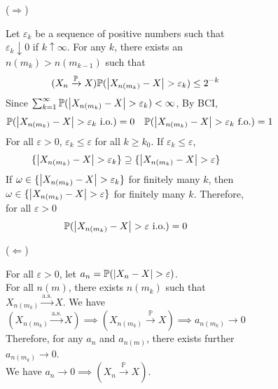 \documentclass{huhtakm-template-book}
\newcommand{\prob}{\mathbb{P}}
\begin{document}
\begin{proofing}
	\begin{figure}[h!]
		\begin{subfigure}[b]{0.05\textwidth}
			($\Longrightarrow$)
		\end{subfigure}
		\begin{subfigure}[t]{0.9\textwidth}
			Let $\varepsilon_{k}$ be a sequence of positive numbers such that $\varepsilon_{k}\downarrow 0$ if $k\uparrow\infty$. For any $k$, there exists an $n(m_{k})>n(m_{k-1})$ such that
			\begin{equation*}
				\tag{$X_{n}\xrightarrow{\prob}X$}
				\prob(\abs{X_{n(m_{k})}-X}>\varepsilon_{k})\leq 2^{-k}
			\end{equation*}
			Since $\sum_{k=1}^{\infty}\prob(\abs{X_{n(m_{k})}-X}>\varepsilon_{k})<\infty$, By BCI,
			\begin{align*}
				\prob(\abs{X_{n(m_{k})}-X}>\varepsilon_{k}\text{ i.o.})&=0 & \prob(\abs{X_{n(m_{k})}-X}>\varepsilon_{k}\text{ f.o.})&=1
			\end{align*}
			For all $\varepsilon>0$, $\varepsilon_{k}\leq\varepsilon$ for all $k\geq k_{0}$. If $\varepsilon_{k}\leq\varepsilon$,
			\begin{equation*}
				\{\abs{X_{n(m_{k})}-X}>\varepsilon_{k}\}\supseteq\{\abs{X_{n(m_{k})}-X}>\varepsilon\}
			\end{equation*}
			If $\omega\in\{\abs{X_{n(m_{k})}-X}>\varepsilon_{k}\}$ for finitely many $k$, then $\omega\in\{\abs{X_{n(m_{k})}-X}>\varepsilon\}$ for finitely many $k$. Therefore, for all $\varepsilon >0$
			\begin{equation*}
				\prob(\abs{X_{n(m_{k})}-X}>\varepsilon\text{ i.o.})=0
			\end{equation*}
		\end{subfigure}
	\end{figure}
	\begin{figure}[h!]
		\begin{subfigure}[b]{0.05\textwidth}
			($\Longleftarrow$)
		\end{subfigure}
		\begin{subfigure}[t]{0.9\textwidth}
			For all $\varepsilon>0$, let $a_{n}=\prob(\abs{X_{n}-X}>\varepsilon)$.\\
			For all $n(m)$, there exists $n(m_{k})$ such that $X_{n(m_{k})}\xrightarrow{\text{a.s.}}X$. We have
			\begin{equation*}
				(X_{n(m_{k})}\xrightarrow{\text{a.s.}}X)\implies(X_{n(m_{k})}\xrightarrow{\prob}X)\implies a_{n(m_{k})}\to 0
			\end{equation*}
			Therefore, for any $a_{n}$ and $a_{n(m)}$, there exists further $a_{n(m_{k})}\to 0$.\\
			We have $a_{n}\to 0\implies(X_{n}\xrightarrow{\prob}X)$.
		\end{subfigure}
	\end{figure}
\end{proofing}
\end{document}
